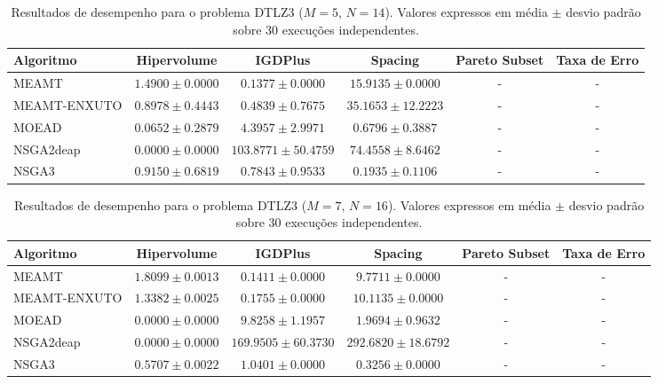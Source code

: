 \begin{table}[htpb]
\centering
\caption{Resultados de desempenho para o problema DTLZ3 ($M=5$, $N=14$). Valores expressos em média $\pm$ desvio padrão sobre 30 execuções independentes.}
\label{tab:DTLZ3_M5_N14}
\begin{tabular}{lccccc}
\hline\hline
Algoritmo & Hipervolume & IGDPlus & Spacing & Pareto Subset & Taxa de Erro \\
\hline
MEAMT & $1.4900 \pm 0.0000$ & $0.1377 \pm 0.0000$ & $15.9135 \pm 0.0000$ & - & - \\
MEAMT-ENXUTO & $0.8978 \pm 0.4443$ & $0.4839 \pm 0.7675$ & $35.1653 \pm 12.2223$ & - & - \\
MOEAD & $0.0652 \pm 0.2879$ & $4.3957 \pm 2.9971$ & $0.6796 \pm 0.3887$ & - & - \\
NSGA2deap & $0.0000 \pm 0.0000$ & $103.8771 \pm 50.4759$ & $74.4558 \pm 8.6462$ & - & - \\
NSGA3 & $0.9150 \pm 0.6819$ & $0.7843 \pm 0.9533$ & $0.1935 \pm 0.1106$ & - & - \\
\hline\hline
\end{tabular}
\end{table}

\begin{table}[htpb]
\centering
\caption{Resultados de desempenho para o problema DTLZ3 ($M=7$, $N=16$). Valores expressos em média $\pm$ desvio padrão sobre 30 execuções independentes.}
\label{tab:DTLZ3_M7_N16}
\begin{tabular}{lccccc}
\hline\hline
Algoritmo & Hipervolume & IGDPlus & Spacing & Pareto Subset & Taxa de Erro \\
\hline
MEAMT & $1.8099 \pm 0.0013$ & $0.1411 \pm 0.0000$ & $9.7711 \pm 0.0000$ & - & - \\
MEAMT-ENXUTO & $1.3382 \pm 0.0025$ & $0.1755 \pm 0.0000$ & $10.1135 \pm 0.0000$ & - & - \\
MOEAD & $0.0000 \pm 0.0000$ & $9.8258 \pm 1.1957$ & $1.9694 \pm 0.9632$ & - & - \\
NSGA2deap & $0.0000 \pm 0.0000$ & $169.9505 \pm 60.3730$ & $292.6820 \pm 18.6792$ & - & - \\
NSGA3 & $0.5707 \pm 0.0022$ & $1.0401 \pm 0.0000$ & $0.3256 \pm 0.0000$ & - & - \\
\hline\hline
\end{tabular}
\end{table}

